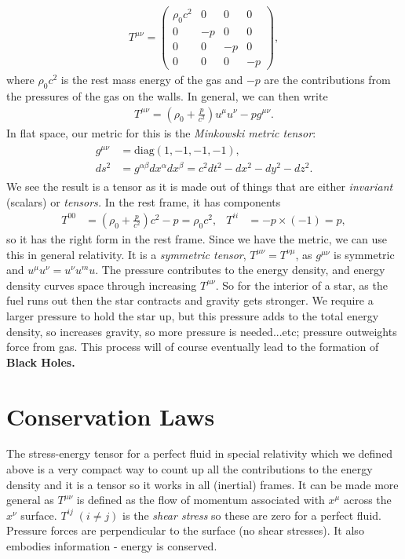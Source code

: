 \documentclass[a4paper, 11pt, normalem]{report}
\begin{document}
\begin{align}
    T^{\mu\nu} = \begin{pmatrix} \rho_0c^2 & 0 & 0 & 0 \\ 0 & -p & 0 & 0 \\ 0 & 0 & -p & 0 \\ 0 & 0 & 0 & -p \end{pmatrix},
\end{align}
where $\rho_0c^2$ is the rest mass energy of the gas and $-p$ are the contributions from the pressures of the gas on the walls.
In general, we can then write
\begin{align}
    T^{\mu\nu} = \left(\rho_0+\frac{p}{c^2}\right)u^\mu u^\nu - pg^{\mu\nu}.
\end{align}
In flat space, our metric for this is the \emph{Minkowski metric tensor}:
\begin{align}
    \begin{split}
        g^{\mu\nu} &= \text{diag}(1,-1,-1,-1), \\
        ds^2 &= g^{\alpha\beta}dx^\alpha dx^\beta = c^2dt^2 - dx^2 - dy^2 - dz^2.
    \end{split}
\end{align}
We see the result is a tensor as it is made out of things that are either \emph{invariant} (scalars) or \emph{tensors.}
In the rest frame, it has components
\begin{align}
    T^{00} &= \left(\rho_0+\frac{p}{c^2}\right)c^2-p = \rho_0c^2, & T^{ii} &= -p\times(-1) = p,
\end{align}
so it has the right form in the rest frame. 
Since we have the metric, we can use this in general relativity. 
It is a \emph{symmetric tensor}, $T^{\mu\nu}=T^{\nu\mu}$, as $g^{\mu\nu}$ is symmetric and $u^\mu u^\nu = u^\nu u^mu$.
The pressure contributes to the energy density, and energy density curves space through increasing $T^{\mu\nu}$.
So for the interior of a star, as the fuel runs out then the star contracts and gravity gets stronger. 
We require a larger pressure to hold the star up, but this pressure adds to the total energy density, so increases gravity, so more pressure is needed...etc; pressure outweights force from gas. 
This process will of course eventually lead to the formation of \textbf{Black Holes.}

\section{Conservation Laws}
The stress-energy tensor for a perfect fluid in special relativity which we defined above is a very compact way to count up all the contributions to the energy density and it is a tensor so it works in all (inertial) frames. 
It can be made more general as $T^{\mu\nu}$ is defined as the flow of momentum associated with $x^\mu$ across the $x^\nu$ surface. 
$T^{ij}\; (i\neq j)$ is the \emph{shear stress} so these are zero for a perfect fluid.
Pressure forces are perpendicular to the surface (no shear stresses).
It also embodies information - energy is conserved. 
\end{document}
